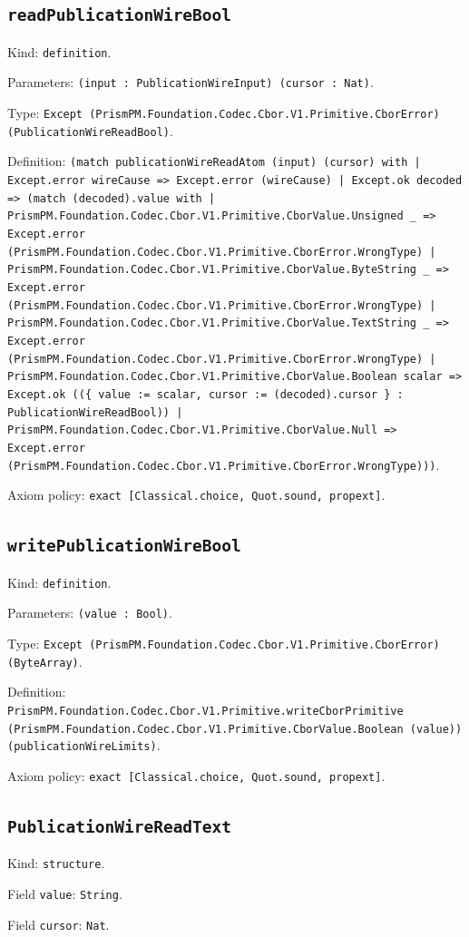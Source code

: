 \documentclass[11pt]{article}
\begin{document}
\subsection*{\texttt{readPublicationWireBool}}
\noindent Kind: \texttt{definition}.\par
\noindent Parameters: \texttt{(input : PublicationWireInput) (cursor : Nat)}.\par
\noindent Type: \texttt{Except (PrismPM.Foundation.Codec.Cbor.V1.Primitive.CborError) (PublicationWireReadBool)}.\par
\noindent Definition: \texttt{(match publicationWireReadAtom (input) (cursor) with | Except.error wireCause => Except.error (wireCause) | Except.ok decoded => (match (decoded).value with | PrismPM.Foundation.Codec.Cbor.V1.Primitive.CborValue.Unsigned \_ => Except.error (PrismPM.Foundation.Codec.Cbor.V1.Primitive.CborError.WrongType) | PrismPM.Foundation.Codec.Cbor.V1.Primitive.CborValue.ByteString \_ => Except.error (PrismPM.Foundation.Codec.Cbor.V1.Primitive.CborError.WrongType) | PrismPM.Foundation.Codec.Cbor.V1.Primitive.CborValue.TextString \_ => Except.error (PrismPM.Foundation.Codec.Cbor.V1.Primitive.CborError.WrongType) | PrismPM.Foundation.Codec.Cbor.V1.Primitive.CborValue.Boolean scalar => Except.ok ((\{ value := scalar, cursor := (decoded).cursor \} : PublicationWireReadBool)) | PrismPM.Foundation.Codec.Cbor.V1.Primitive.CborValue.Null => Except.error (PrismPM.Foundation.Codec.Cbor.V1.Primitive.CborError.WrongType)))}.\par
\noindent Axiom policy: \texttt{exact [Classical.choice, Quot.sound, propext]}.\par
\subsection*{\texttt{writePublicationWireBool}}
\noindent Kind: \texttt{definition}.\par
\noindent Parameters: \texttt{(value : Bool)}.\par
\noindent Type: \texttt{Except (PrismPM.Foundation.Codec.Cbor.V1.Primitive.CborError) (ByteArray)}.\par
\noindent Definition: \texttt{PrismPM.Foundation.Codec.Cbor.V1.Primitive.writeCborPrimitive (PrismPM.Foundation.Codec.Cbor.V1.Primitive.CborValue.Boolean (value)) (publicationWireLimits)}.\par
\noindent Axiom policy: \texttt{exact [Classical.choice, Quot.sound, propext]}.\par
\subsection*{\texttt{PublicationWireReadText}}
\noindent Kind: \texttt{structure}.\par
\noindent Field \texttt{value}: \texttt{String}.\par
\noindent Field \texttt{cursor}: \texttt{Nat}.\par
\end{document}
